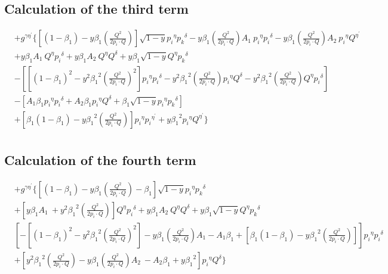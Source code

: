 \subsection*{Calculation of the third term}
\begin{equation}
\begin{split} 
&+g^{{{\gamma}}{{\eta}^{\prime}}}\lbrace [(1-\beta_1)-y\beta_1 (\frac{Q^2}{2p_i \cdot Q})] \sqrt{1-y}{p_i}^{{\eta}}{{p_k}^{{\delta}}}-y {\beta_1} (\frac{Q^2}{2p_i \cdot Q}) A_1 \:{p_i}^{{\eta}}{p_i}^{{\delta}}
-y {\beta_1} (\frac{Q^2}{2p_i \cdot Q}) A_2\: {p_i}^{{\eta}}{Q}^{{\eta}^{\prime}}\\
&+y {\beta_1} A_1 \:{Q}^{{\eta}}{p_i}^{{\delta}}+y {\beta_1} A_2 \:{Q}^{{\eta}}{Q}^{{\delta}}+y {\beta_1}\sqrt{1-y}{Q}^{{\eta}}{{p_k}^{{\delta}}}\\
&-[[(1-\beta_1)^2-y^2 {\beta_1}^2 (\frac{Q^2}{2p_i \cdot Q})^2] {p_i}^{{\eta}}{p_i}^{{\delta}}-y^2 {\beta_1}^2 (\frac{Q^2}{2p_i \cdot Q}){p_i}^{{\eta}}{Q}^{{\delta}}-y^2 {\beta_1}^2 (\frac{Q^2}{2p_i \cdot Q}){Q}^{{\eta}}{p_i}^{{\delta}}]\\
&-[A_1\beta_1 {p_i}^{{\eta}}{{p_i}^{{\delta}}}+A_2\beta_1 {p_i}^{{\eta}}{{Q}^{{\delta}}}+\beta_1 \sqrt{1-y}{p_i}^{{\eta}}{{p_k}^{{\delta}}}]\\
&+[\beta_1(1-\beta_1)-y {\beta_1}^2 (\frac{Q^2}{2p_i \cdot Q})] {p_i}^{{\eta}}{p_i}^{{\eta}^{\prime}}+y {\beta_1}^2 {p_i}^{{\eta}}{Q}^{{\eta}^{\prime}}\rbrace\\
\end{split}
\end{equation}

\subsection*{Calculation of the fourth term}
\begin{equation}
\begin{split} 
&+g^{{{\gamma}}{{\eta}^{\prime}}}\lbrace [(1-\beta_1)-y\beta_1 (\frac{Q^2}{2p_i \cdot Q})-\beta_1] \sqrt{1-y}{p_i}^{{\eta}}{{p_k}^{{\delta}}}\\
&+[y {\beta_1} A_1 \:+y^2 {\beta_1}^2 (\frac{Q^2}{2p_i \cdot Q})]{Q}^{{\eta}}{p_i}^{{\delta}}+y {\beta_1} A_2 \:{Q}^{{\eta}}{Q}^{{\delta}}+y {\beta_1}\sqrt{1-y}{Q}^{{\eta}}{{p_k}^{{\delta}}}\\
&[-[(1-\beta_1)^2-y^2 {\beta_1}^2 (\frac{Q^2}{2p_i \cdot Q})^2]-y {\beta_1} (\frac{Q^2}{2p_i \cdot Q}) A_1 -A_1\beta_1 +[\beta_1(1-\beta_1)-y {\beta_1}^2 (\frac{Q^2}{2p_i \cdot Q})]] {p_i}^{{\eta}}{p_i}^{{\delta}}\\
& +[y^2 {\beta_1}^2 (\frac{Q^2}{2p_i \cdot Q})-y {\beta_1} (\frac{Q^2}{2p_i \cdot Q}) A_2\:-A_2\beta_1 +y {\beta_1}^2] {p_i}^{{\eta}}{Q}^{{\delta}}\rbrace\\
\end{split}
\end{equation}

